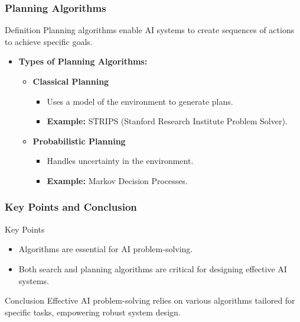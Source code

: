 \documentclass[aspectratio=169]{beamer}
\begin{document}
\begin{frame}[fragile]
    \frametitle{Planning Algorithms}
    \begin{block}{Definition}
        Planning algorithms enable AI systems to create sequences of actions to achieve specific goals.
    \end{block}

    \begin{itemize}
        \item \textbf{Types of Planning Algorithms:}
        \begin{itemize}
            \item \textbf{Classical Planning}
            \begin{itemize}
                \item Uses a model of the environment to generate plans.
                \item \textbf{Example:} STRIPS (Stanford Research Institute Problem Solver).
            \end{itemize}
            \item \textbf{Probabilistic Planning}
            \begin{itemize}
                \item Handles uncertainty in the environment.
                \item \textbf{Example:} Markov Decision Processes.
            \end{itemize}
        \end{itemize}
    \end{itemize}
\end{frame}

\begin{frame}[fragile]
    \frametitle{Key Points and Conclusion}
    \begin{block}{Key Points}
        \begin{itemize}
            \item Algorithms are essential for AI problem-solving.
            \item Both search and planning algorithms are critical for designing effective AI systems.
        \end{itemize}
    \end{block}

    \begin{block}{Conclusion}
        Effective AI problem-solving relies on various algorithms tailored for specific tasks, empowering robust system design.
    \end{block}
\end{frame}
\end{document}
